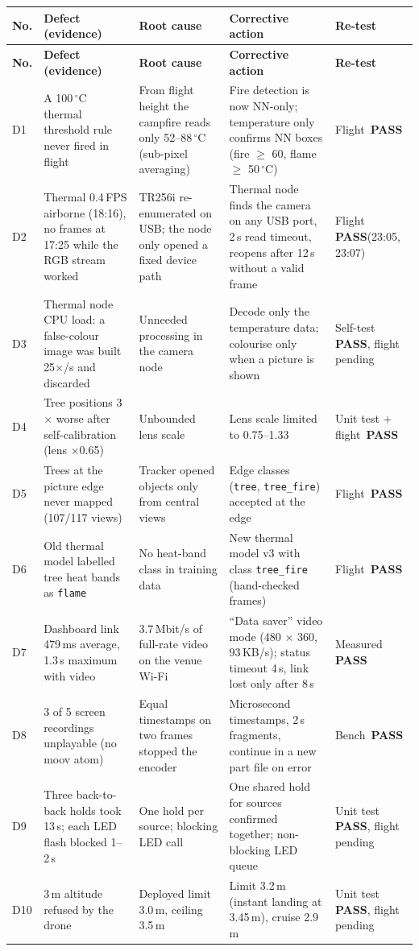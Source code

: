 \documentclass[10pt,a4paper]{article}
\newcommand{\PASS}{\textcolor{passgreen}{\textbf{\ding{51}\,PASS}}}
\newcommand{\head}[1]{\textbf{#1}}
\begin{document}
\begin{longtable}{|L{0.6cm}|L{4.0cm}|L{4.1cm}|L{4.6cm}|L{1.7cm}|}
\hline
{}\head{No.} & \head{Defect (evidence)} & \head{Root cause} & \head{Corrective action} & \head{Re-test} \\ \hline
\endfirsthead
\hline
{}\head{No.} & \head{Defect (evidence)} & \head{Root cause} & \head{Corrective action} & \head{Re-test} \\ \hline
\endhead
D1 & A 100\,$^\circ$C thermal threshold rule never fired in flight & From flight height the campfire reads only 52--88\,$^\circ$C (sub-pixel averaging) & Fire detection is now NN-only; temperature only confirms NN boxes (fire $\ge$ 60, flame $\ge$ 50\,$^\circ$C) & Flight \PASS \\ \hline
D2 & Thermal 0.4\,FPS airborne (18:16), no frames at 17:25 while the RGB stream worked & TR256i re-enumerated on USB; the node only opened a fixed device path & Thermal node finds the camera on any USB port, 2\,s read timeout, reopens after 12\,s without a valid frame & Flight \PASS (23:05, 23:07) \\ \hline
D3 & Thermal node CPU load: a false-colour image was built 25$\times$/s and discarded & Unneeded processing in the camera node & Decode only the temperature data; colourise only when a picture is shown & Self-test \PASS, flight pending \\ \hline
D4 & Tree positions 3$\times$ worse after self-calibration (lens $\times$0.65) & Unbounded lens scale & Lens scale limited to 0.75--1.33 & Unit test + flight \PASS \\ \hline
D5 & Trees at the picture edge never mapped (107/117 views) & Tracker opened objects only from central views & Edge classes (\texttt{tree}, \texttt{tree\_fire}) accepted at the edge & Flight \PASS \\ \hline
D6 & Old thermal model labelled tree heat bands as \texttt{flame} & No heat-band class in training data & New thermal model v3 with class \texttt{tree\_fire} (hand-checked frames) & Flight \PASS \\ \hline
D7 & Dashboard link 479\,ms average, 1.3\,s maximum with video & 3.7\,Mbit/s of full-rate video on the venue Wi-Fi & ``Data saver'' video mode (480 $\times$ 360, 93\,KB/s); status timeout 4\,s, link lost only after 8\,s & Measured \PASS \\ \hline
D8 & 3 of 5 screen recordings unplayable (no moov atom) & Equal timestamps on two frames stopped the encoder & Microsecond timestamps, 2\,s fragments, continue in a new part file on error & Bench \PASS \\ \hline
D9 & Three back-to-back holds took 13\,s; each LED flash blocked 1--2\,s & One hold per source; blocking LED call & One shared hold for sources confirmed together; non-blocking LED queue & Unit test \PASS, flight pending \\ \hline
D10 & 3\,m altitude refused by the drone & Deployed limit 3.0\,m, ceiling 3.5\,m & Limit 3.2\,m (instant landing at 3.45\,m), cruise 2.9\,m & Unit test \PASS, flight pending \\ \hline
\end{longtable}
\end{document}
